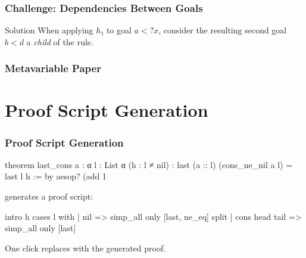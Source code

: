 \documentclass[xetex]{beamer}
\newcommand{\mv}[1]{\ensuremath{\mathit{?#1}}}
\begin{document}
\begin{frame}
  \frametitle{Challenge: Dependencies Between Goals}

  \begin{tcolorbox}
    \centering
  \end{tcolorbox}

  \begin{block}{Solution}
    When applying $h₁$ to goal $a < \mv{x}$, consider the resulting second goal $b < d$ a \emph{child} of the rule.
  \end{block}
\end{frame}

\begin{frame}
  \frametitle{Metavariable Paper}

\end{frame}

\section{Proof Script Generation}

\begin{frame}[fragile]
  \frametitle{Proof Script Generation}

  \begin{leancode}
    theorem last_cons {a : α} {l : List α} (h : l ≠ nil) :
        last (a :: l) (cons_ne_nil a l) = last l h := by
      aesop? (add 1%
  \end{leancode}

  \pause

   generates a proof script:

  \begin{leancode}
    intro h
    cases l with
    | nil =>
      simp_all only [last, ne_eq]
      split
    | cons head tail => simp_all only [last]
  \end{leancode}

  One click replaces  with the generated proof.
\end{frame}
\end{document}
